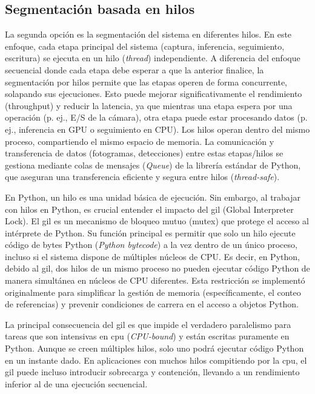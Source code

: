\documentclass[11pt,spanish,listoffigures,listoftables]{tfgetsinf}
\begin{document}
\subsection{Segmentación basada en hilos} \label{sub:segmentacion_hilos}

La segunda opción es la segmentación del sistema en diferentes hilos. En este enfoque, cada etapa principal del sistema (captura, inferencia, seguimiento, escritura) se ejecuta en un hilo (\textit{thread}) independiente. A diferencia del enfoque secuencial donde cada etapa debe esperar a que la anterior finalice, la segmentación por hilos permite que las etapas operen de forma concurrente, solapando sus ejecuciones. Esto puede mejorar significativamente el rendimiento (throughput) y reducir la latencia, ya que mientras una etapa espera por una operación (p. ej., E/S de la cámara), otra etapa puede estar procesando datos (p. ej., inferencia en GPU o seguimiento en CPU). Los hilos operan dentro del mismo proceso, compartiendo el mismo espacio de memoria. La comunicación y transferencia de datos (fotogramas, detecciones) entre estas etapas/hilos se gestiona mediante colas de mensajes (\textit{Queue}) de la librería estándar de Python, que aseguran una transferencia eficiente y segura entre hilos (\textit{thread-safe}).


En Python, un hilo es una unidad básica de ejecución. Sin embargo, al trabajar con hilos en Python, es crucial entender el impacto del \gls{gil} (Global Interpreter Lock). El \gls{gil} es un mecanismo de bloqueo mutuo (mutex) que protege el acceso al intérprete de Python. Su función principal es permitir que solo un hilo ejecute código de bytes Python (\textit{Python bytecode}) a la vez dentro de un único proceso, incluso si el sistema dispone de múltiples núcleos de CPU. Es decir, en Python, debido al \gls{gil}, dos hilos de un mismo proceso no pueden ejecutar código Python de manera simultánea en núcleos de CPU diferentes. Esta restricción se implementó originalmente para simplificar la gestión de memoria (específicamente, el conteo de referencias) y prevenir condiciones de carrera en el acceso a objetos Python.

La principal consecuencia del \gls{gil} es que impide el verdadero paralelismo para tareas que son intensivas en \gls{cpu} (\textit{CPU-bound}) y están escritas puramente en Python. Aunque se creen múltiples hilos, solo uno podrá ejecutar código Python en un instante dado. En aplicaciones con muchos hilos compitiendo por la \gls{cpu}, el \gls{gil} puede incluso introducir sobrecarga y contención, llevando a un rendimiento inferior al de una ejecución secuencial.
\end{document}
